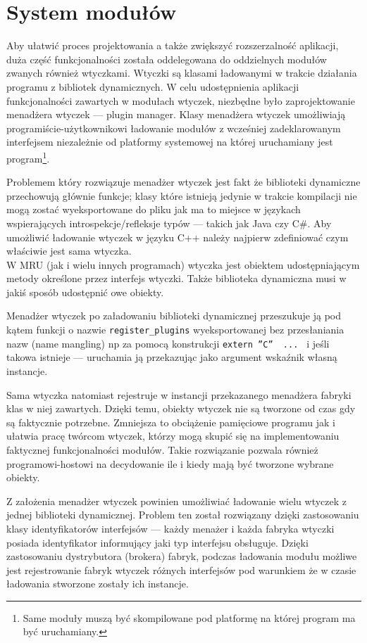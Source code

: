 \section{System modułów}
\label{system-modulow}
\par
Aby ułatwić proces projektowania a także zwiększyć rozszerzalność aplikacji, duża część funkcjonalności została oddelegowana do oddzielnych modułów zwanych również wtyczkami.
Wtyczki są klasami ładowanymi w trakcie działania programu z bibliotek dynamicznych.
W celu udostępnienia aplikacji funkcjonalności zawartych w modułach wtyczek, niezbędne było zaprojektowanie menadżera wtyczek --- plugin manager.
Klasy menadżera wtyczek umożliwiają programiście-użytkownikowi ładowanie modułów z wcześniej zadeklarowanym interfejsem niezależnie od platformy systemowej na której uruchamiany jest program\footnote{Same moduły muszą być skompilowane pod platformę na której program ma być uruchamiany.}.

\par
Problemem który rozwiązuje menadżer wtyczek jest fakt że biblioteki dynamiczne przechowują głównie funkcje; klasy które istnieją jedynie w trakcie kompilacji nie mogą zostać wyeksportowane do pliku jak ma to miejsce w językach wspierających introspekcje/refleksje typów --- takich jak Java czy C\#.
Aby umożliwić ładowanie wtyczek w języku C++ należy najpierw zdefiniować czym właściwie jest sama wtyczka.\\

W MRU (jak i wielu innych programach) wtyczka jest obiektem udostępniającym metody określone przez interfejs wtyczki. Także biblioteka dynamiczna musi w jakiś sposób udostępnić owe obiekty.

\par
Menadżer wtyczek po załadowaniu biblioteki dynamicznej przeszukuje ją pod kątem funkcji o nazwie \texttt{register\_plugins} wyeksportowanej bez przesłaniania nazw (name mangling) np za pomocą konstrukcji \texttt{extern ''C'' { ... }} i jeśli takowa istnieje --- uruchamia ją przekazując jako argument wskaźnik własną instancje.
\par
Sama wtyczka natomiast rejestruje w instancji przekazanego menadżera fabryki klas w niej zawartych.
Dzięki temu, obiekty wtyczek nie są tworzone od czas gdy są faktycznie potrzebne. Zmniejsza to obciążenie pamięciowe programu jak i ułatwia pracę twórcom wtyczek, którzy mogą skupić się na implementowaniu faktycznej funkcjonalności modułów. Takie rozwiązanie pozwala również programowi-hostowi na decydowanie ile i kiedy mają być tworzone wybrane obiekty.
\par
Z założenia menadżer wtyczek powinien umożliwiać ładowanie wielu wtyczek z jednej biblioteki dynamicznej.
Problem ten został rozwiązany dzięki zastosowaniu klasy identyfikatorów interfejsów --- każdy menażer i każda fabryka wtyczki posiada identyfikator informujący jaki typ interfejsu obsługuje. Dzięki zastosowaniu dystrybutora (brokera) fabryk, podczas ładowania modułu możliwe jest rejestrowanie fabryk wtyczek różnych interfejsów pod warunkiem że w czasie ładowania stworzone zostały ich instancje.

